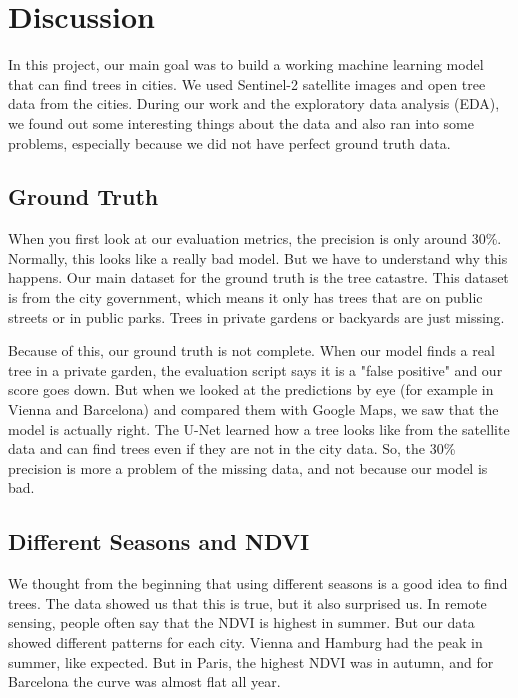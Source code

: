 \section{Discussion}

In this project, our main goal was to build a working machine learning model that can find trees in cities. We used Sentinel-2 satellite images and open tree data from the cities. During our work and the exploratory data analysis (EDA), we found out some interesting things about the data and also ran into some problems, especially because we did not have perfect ground truth data. 

\subsection{Ground Truth}

When you first look at our evaluation metrics, the precision is only around 30\%. Normally, this looks like a really bad model. But we have to understand why this happens. Our main dataset for the ground truth is the tree catastre. This dataset is from the city government, which means it only has trees that are on public streets or in public parks. Trees in private gardens or backyards are just missing. 

Because of this, our ground truth is not complete. When our model finds a real tree in a private garden, the evaluation script says it is a "false positive" and our score goes down. But when we looked at the predictions by eye (for example in Vienna and Barcelona) and compared them with Google Maps, we saw that the model is actually right. The U-Net learned how a tree looks like from the satellite data and can find trees even if they are not in the city data. So, the 30\% precision is more a problem of the missing data, and not because our model is bad.

\subsection{Different Seasons and NDVI}

We thought from the beginning that using different seasons is a good idea to find trees. The data showed us that this is true, but it also surprised us. In remote sensing, people often say that the NDVI is highest in summer. But our data showed different patterns for each city. Vienna and Hamburg had the peak in summer, like expected. But in Paris, the highest NDVI was in autumn, and for Barcelona the curve was almost flat all year. 

